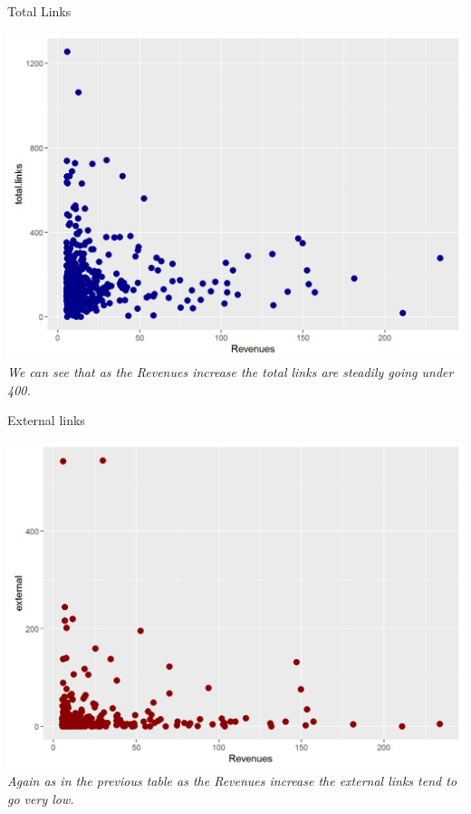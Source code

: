 \documentclass{article}
\begin{document}
\begin{table}[H]
\centering
\caption{Total Links}
\begin{center}
\includegraphics[scale=0.5]{../R/photos/24_totlinks_rev.png}  \\
\textit{We can see that as the Revenues increase the total links are steadily going under 400.}
\end{center}
\end{table}

\begin{table}[H]
\centering
\caption{External links}
\begin{center}
\includegraphics[scale=0.5]{../R/photos/26_ext_rev.png}  \\
\textit{Again as in the previous table as the Revenues increase the external links tend to go very low.}
\end{center}
\end{table}
\end{document}
